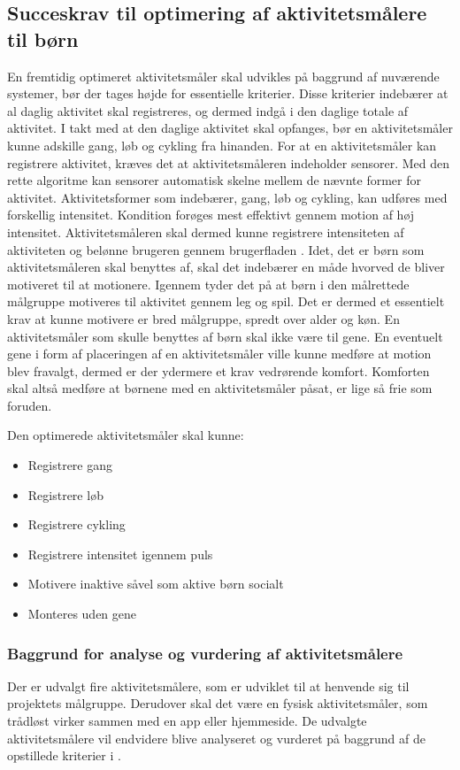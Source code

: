 \subsection{Succeskrav til optimering af aktivitetsmålere til børn} \label{succeskrav}
En fremtidig optimeret aktivitetsmåler skal udvikles på baggrund af nuværende systemer, bør der tages højde for essentielle kriterier. Disse kriterier indebærer at al daglig aktivitet skal registreres, og dermed indgå i den daglige totale af aktivitet. I takt med at den daglige aktivitet skal opfanges, bør en aktivitetsmåler kunne adskille gang, løb og cykling fra hinanden. For at en aktivitetsmåler kan registrere aktivitet, kræves det at aktivitetsmåleren indeholder sensorer. Med den rette algoritme kan sensorer automatisk skelne mellem de nævnte former for aktivitet. \newline 
Aktivitetsformer som indebærer, gang, løb og cykling, kan udføres med forskellig intensitet. Kondition forøges mest effektivt gennem motion af høj intensitet. Aktivitetsmåleren skal dermed kunne registrere intensiteten af aktiviteten og belønne brugeren gennem brugerfladen \citep{Hjerteforeningen}. Idet, det er børn som aktivitetsmåleren skal benyttes af, skal det indebærer en måde hvorved de bliver motiveret til at motionere. Igennem  tyder det på at børn i den målrettede målgruppe motiveres til aktivitet gennem leg og spil. Det er dermed et essentielt krav at kunne motivere er bred målgruppe, spredt over alder og køn. En aktivitetsmåler som skulle benyttes af børn skal ikke være til gene. En eventuelt gene i form af placeringen af en aktivitetsmåler ville kunne medføre at motion blev fravalgt, dermed er der ydermere et krav vedrørende komfort. Komforten skal altså medføre at børnene med en aktivitetsmåler påsat, er lige så frie som foruden.

Den optimerede aktivitetsmåler skal kunne: 
\begin{itemize}
\item Registrere gang
\item Registrere løb
\item Registrere cykling
\item Registrere intensitet igennem puls
\item Motivere inaktive såvel som aktive børn socialt
\item Monteres uden gene
\end{itemize}

\subsubsection{Baggrund for analyse og vurdering af aktivitetsmålere}
Der er udvalgt fire aktivitetsmålere, som er udviklet til at henvende sig til projektets målgruppe. Derudover skal det være en fysisk aktivitetsmåler, som trådløst virker sammen med en app eller hjemmeside. 
De udvalgte aktivitetsmålere vil endvidere blive analyseret og vurderet på baggrund af de opstillede kriterier i .

